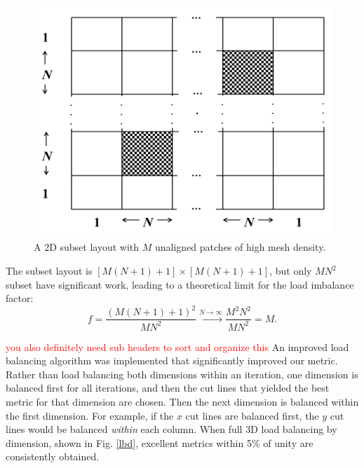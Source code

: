 \documentclass[letterpaper]{mandc2019}
\newcommand{\jcr}[1]{\textcolor{red}{#1}}
\begin{document}
\begin{figure}[H]
\centering
\includegraphics[scale=0.6]{figures/2dgeneral.png}
\caption{A 2D subset layout with $M$ unaligned patches of high mesh density.}
\label{2dgeneral}
\end{figure}

The subset layout is $[M(N+1)+1] \times [M(N+1)+1]$, but only $MN^2$ subset have significant work, leading to a theoretical limit for the load imbalance factor:
\begin{equation}
f= \frac{\left( M(N+1)+1 \right)^2}{MN^2} \xrightarrow{N\to \infty} \frac{M^2N^2}{MN^2} = M.
\end{equation}

\jcr{you also definitely need sub headers to sort and organize this}
An improved load balancing algorithm was implemented that significantly improved our metric. Rather than load balancing both dimensions within an iteration, one dimension is balanced first for all iterations, and then the cut lines that yielded the best metric for that dimension are chosen. Then the next dimension is balanced within the first dimension. For example, if the $x$ cut lines are balanced first, the $y$ cut lines would be balanced \textit{within} each column. When full 3D load balancing by dimension, shown in Fig. \ref{lbd}, excellent metrics within 5\% of unity are consistently obtained.
\end{document}
